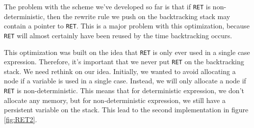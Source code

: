 \documentclass{book}
\theoremstyle{definition}
\begin{document}
The problem with the scheme we've developed so far is that
if \texttt{RET} is non-deterministic, 
then the rewrite rule we push on the backtracking stack may
contain a pointer to \texttt{RET}.
This is a major problem with this optimization,
because \texttt{RET} will almost certainly have been reused
by the time backtracking occurs.

This optimization was built on the idea that \texttt{RET}
is only ever used in a single case expression.
Therefore, it's important that we never put \texttt{RET} on the backtracking stack.
We need rethink on our idea.
Initially, we wanted to avoid allocating a node if a variable is used in a single case.
Instead, we will only allocate a node if \texttt{RET} is non-deterministic.
This means that for deterministic expression, we don't allocate any memory,
but for non-deterministic expression, we still have a persistent variable on the stack.
This lead to the second implementation in figure \ref{fig:RET2}.
\end{document}
